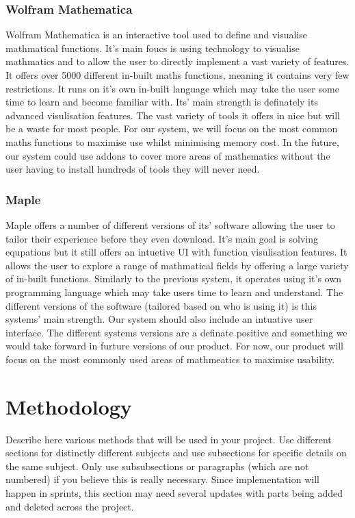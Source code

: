 \documentclass[a4paper, oneside, 11pt]{report}
\begin{document}
\subsection{Wolfram Mathematica\cite{Mathematica}}

Wolfram Mathematica is an interactive tool used to define and visualise mathmatical functions. It's main foucs is using technology to visualise mathmatics and to allow the user to directly implement a vast variety of features. It offers over 5000 different in-built maths functions, meaning it contains very few restrictions. It runs on it's own in-built language which may take the user some time to learn and become familiar with. Its' main strength is definately its advanced visulisation features.
The vast variety of tools it offers in nice but will be a waste for most people. For our system, we will focus on the most common maths functions to maximise use whilst minimising memory cost. In the future, our system could use addons to cover more areas of mathematics without the user having to install hundreds of tools they will never need.


\subsection{Maple\cite{Maple}}

Maple offers a number of different versions of its' software allowing the user to tailor their experience before they even download. It's main goal is solving equpations but it still offers an intuetive UI with function visulisation features. It allows the user to explore a range of mathmatical fields by offering a large variety of in-built functions. Similarly to the previous system, it operates using it's own programming language which may take users time to learn and understand. The different versions of the software (tailored based on who is using it) is this systems' main strength.
Our system should also include an intuative user interface. The different systems versions are a definate positive and something we would take forward in furture versions of our product. For now, our product will focus on the most commonly used areas of mathmeatics to maximise usability.



\chapter{Methodology}\label{MethLab}

Describe here various methods that will be used in your project. Use different sections for distinctly different subjects and use subsections for specific details on the same subject. Only use subsubsections or paragraphs (which are not numbered) if you believe this is really necessary. Since implementation will happen in sprints, this section may need several updates with parts being added and deleted across the project.
\end{document}
